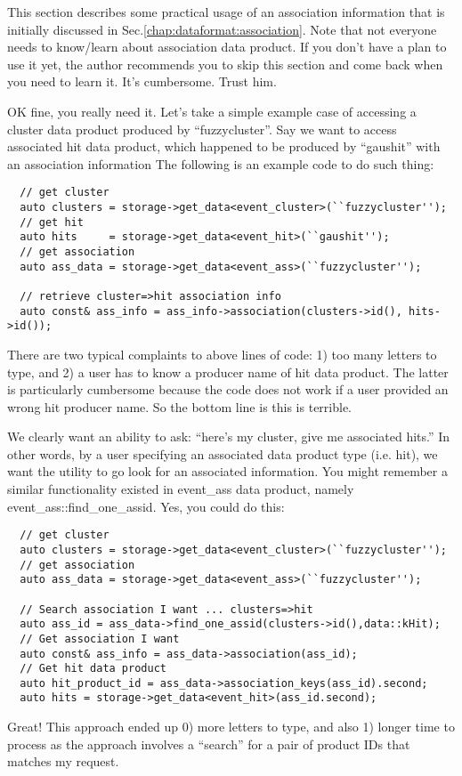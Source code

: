 This section describes some practical usage of an association information that is initially discussed
in Sec.\ref{chap:dataformat:association}. Note that not everyone needs to know/learn about association
data product. If you don't have a plan to use it yet, the author recommends you to skip this section
and come back when you need to learn it. It's cumbersome. Trust him.

OK fine, you really need it. Let's take a simple example case of accessing a {\ttfamily cluster} data
product produced by ``fuzzycluster''. Say we want to access associated {\ttfamily hit} data product,
which happened to be produced by ``gaushit'' with an association information
The following is an example code to do such thing:
\begin{lstlisting}
  // get cluster
  auto clusters = storage->get_data<event_cluster>(``fuzzycluster'');
  // get hit
  auto hits     = storage->get_data<event_hit>(``gaushit'');
  // get association
  auto ass_data = storage->get_data<event_ass>(``fuzzycluster'');

  // retrieve cluster=>hit association info
  auto const& ass_info = ass_info->association(clusters->id(), hits->id()); 
\end{lstlisting}
There are two typical complaints to above lines of code: 1) too many letters to type, and 2) a user
has to know a producer name of {\ttfamily hit} data product. The latter is particularly cumbersome
because the code does not work if a user provided an wrong hit producer name. So the bottom line
is this is terrible.

We clearly want an ability to ask: ``here's my cluster, give me associated hits.''
In other words, by a user specifying an associated data product type (i.e. {\ttfamily hit}), we
want the utility to go look for an associated information. You might remember a similar functionality
existed in {\ttfamily event\_ass} data product, namely {\ttfamily event\_ass::find\_one\_assid}.
Yes, you could do this:
\begin{lstlisting}
  // get cluster
  auto clusters = storage->get_data<event_cluster>(``fuzzycluster'');
  // get association
  auto ass_data = storage->get_data<event_ass>(``fuzzycluster''); 

  // Search association I want ... clusters=>hit
  auto ass_id = ass_data->find_one_assid(clusters->id(),data::kHit);
  // Get association I want
  auto const& ass_info = ass_data->association(ass_id);
  // Get hit data product
  auto hit_product_id = ass_data->association_keys(ass_id).second;
  auto hits = storage->get_data<event_hit>(ass_id.second);
\end{lstlisting}
Great! This approach ended up 0) more letters to type, and also 1) longer time to process as
the approach involves a ``search'' for a pair of product IDs that matches my request.

